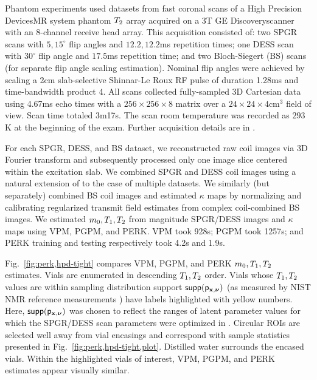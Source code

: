 Phantom experiments used datasets 
from fast coronal scans
of a High Precision Devices\regis MR system phantom $T_2$ array
acquired on a 3T GE Discovery\tmark scanner
with an 8-channel receive head array.
This acquisition consisted of: 
two SPGR scans 
with $5,15^\circ$ flip angles
and $12.2,12.2$ms repetition times;
one DESS scan 
with $30^\circ$ flip angle
and $17.5$ms repetition time;
and two Bloch-Siegert (BS) scans \cite{sacolick:10:bmb}
(for separate flip angle scaling estimation).
Nominal flip angles were achieved 
by scaling a 2cm slab-selective Shinnar-Le Roux RF pulse \cite{pauly:91:prf}
of duration 1.28ms and time-bandwidth product 4.
All scans collected fully-sampled 3D Cartesian data
using 4.67ms echo times
with a $256\times256\times8$ matrix
over a $24\times24\times4$cm$^3$ field of view. 
Scan time totaled 3m17s. 
The scan room temperature was recorded as $293$K
at the beginning of the exam. 
Further acquisition details are in \cite{nataraj:17:oms}.

For each SPGR, DESS, and BS dataset, 
we reconstructed raw coil images via 3D Fourier transform
and subsequently processed only one image slice
centered within the excitation slab.
We combined SPGR and DESS coil images 
using a natural extension of \cite{ying:07:jir}
to the case of multiple datasets.
We similarly (but separately) combined BS coil images
and estimated $\kappa$ maps
by normalizing and calibrating
regularized transmit field estimates \cite{sun:14:reo}
from complex coil-combined BS images.
We estimated $m_0,T_1,T_2$
from magnitude SPGR/DESS images and $\kappa$ maps
using VPM, PGPM, and PERK.
VPM took 928s;
PGPM took 1257s; 
and PERK training and testing
respectively took 4.2s and 1.9s.

Fig.~\ref{fig:perk,hpd-tight} compares
VPM, PGPM, and PERK $m_0,T_1,T_2$ estimates.
Vials are enumerated in descending $T_1,T_2$ order.
Vials whose $T_1,T_2$ values
are within sampling distribution support $\supp{\dist{\bmx,\bmnu}}$
(as measured by NIST NMR reference measurements \cite{keenan:16:msm})
have labels highlighted
with yellow numbers.
Here, 
$\supp{\dist{\bmx,\bmnu}}$ was chosen 
to reflect the ranges of latent parameter values
for which the SPGR/DESS scan parameters 
were optimized in \cite{nataraj:17:oms}.
Circular ROIs are selected well away from vial encasings
and correspond with sample statistics 
presented in Fig.~\ref{fig:perk,hpd-tight,plot}.                                                                                                                                                                                 
Distilled water surrounds the encased vials.
Within the highlighted vials of interest,
VPM, PGPM, and PERK estimates 
appear visually similar.

